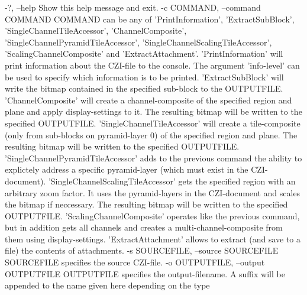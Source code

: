\begin{DoxyVerb}
  -?, --help          Show this help message and exit.
  -c COMMAND, --command COMMAND
                      COMMAND can be any of 'PrintInformation',
                      'ExtractSubBlock', 'SingleChannelTileAccessor',
                      'ChannelComposite', 'SingleChannelPyramidTileAccessor',
                      'SingleChannelScalingTileAccessor',
                      'ScalingChannelComposite' and 'ExtractAttachment'.
                      'PrintInformation' will print information about the
                      CZI-file to the console. The argument 'info-level' can be
                      used to specify which information is to be printed.
                      'ExtractSubBlock' will write the bitmap contained in the
                      specified sub-block to the OUTPUTFILE.
                      'ChannelComposite' will create a channel-composite of the
                      specified region and plane and apply display-settings to
                      it. The resulting bitmap will be written to the specified
                      OUTPUTFILE.
                      'SingleChannelTileAccessor' will create a tile-composite
                      (only from sub-blocks on pyramid-layer 0) of the
                      specified region and plane. The resulting bitmap will be
                      written to the specified OUTPUTFILE.
                      'SingleChannelPyramidTileAccessor' adds to the previous
                      command the ability to explictely address a specific
                      pyramid-layer (which must exist in the CZI-document).
                      'SingleChannelScalingTileAccessor' gets the specified
                      region with an arbitrary zoom factor. It uses the
                      pyramid-layers in the CZI-document and scales the bitmap
                      if neccessary. The resulting bitmap will be written to
                      the specified OUTPUTFILE.
                      'ScalingChannelComposite' operates like the previous
                      command, but in addition gets all channels and creates a
                      multi-channel-composite from them using display-settings.
                      'ExtractAttachment' allows to extract (and save to a
                      file) the contents of attachments.
  -s SOURCEFILE, --source SOURCEFILE
                      SOURCEFILE specifies the source CZI-file.
  -o OUTPUTFILE, --output OUTPUTFILE
                      OUTPUTFILE specifies the output-filename. A suffix will
                      be appended to the name given here depending on the type

\end{DoxyVerb}
